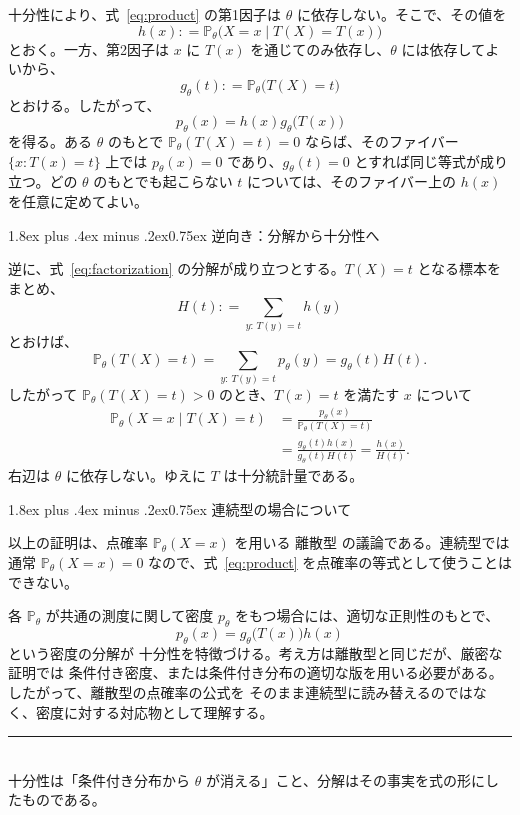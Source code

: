 \documentclass[11pt,a4paper]{article}
\makeatletter
\renewcommand\section{\@startsection{section}{1}{0pt}%
  {1.8ex plus .4ex minus .2ex}{0.75ex}%
  {\headingfont\large\color{accent}}}
\theoremstyle{factorization}
\newcommand{\given}{\mathrel{|}}
\newcommand{\Prob}{\mathbb{P}}
\newcommand{\coloneqq}{\mathrel{\mathop{:}}=}
\newcommand{\keyterm}[1]{{\headingfont\color{highlight}#1}}
\makeatother
\begin{document}
十分性により、式~\eqref{eq:product} の第1因子は $\theta$ に依存しない。そこで、その値を
\[
  h(x)
  \coloneqq
  \Prob_\theta\!\bigl(X=x\given T(X)=T(x)\bigr)
\]
とおく。一方、第2因子は $x$ に $T(x)$ を通じてのみ依存し、$\theta$ には依存してよいから、
\[
  g_\theta(t)
  \coloneqq
  \Prob_\theta\!\bigl(T(X)=t\bigr)
\]
とおける。したがって、
\[
  \boxed{\;p_\theta(x)=h(x)g_\theta\!\bigl(T(x)\bigr)\;}
\]
を得る。ある $\theta$ のもとで $\Prob_\theta(T(X)=t)=0$ ならば、そのファイバー $\{x:T(x)=t\}$ 上では $p_\theta(x)=0$ であり、$g_\theta(t)=0$ とすれば同じ等式が成り立つ。どの $\theta$ のもとでも起こらない $t$ については、そのファイバー上の $h(x)$ を任意に定めてよい。

\section{逆向き：分解から十分性へ}

逆に、式~\eqref{eq:factorization} の分解が成り立つとする。$T(X)=t$ となる標本をまとめ、
\[
  H(t)\coloneqq\sum_{y:\,T(y)=t}h(y)
\]
とおけば、
\[
  \Prob_\theta(T(X)=t)
  =\sum_{y:\,T(y)=t}p_\theta(y)
  =g_\theta(t)H(t).
\]
したがって $\Prob_\theta(T(X)=t)>0$ のとき、$T(x)=t$ を満たす $x$ について
\begin{align*}
  \Prob_\theta(X=x\given T(X)=t)
  &=\frac{p_\theta(x)}{\Prob_\theta(T(X)=t)}\\
  &=\frac{g_\theta(t)h(x)}{g_\theta(t)H(t)}
    =\frac{h(x)}{H(t)}.
\end{align*}
右辺は $\theta$ に依存しない。ゆえに $T$ は十分統計量である。

\section{連続型の場合について}

以上の証明は、点確率 $\Prob_\theta(X=x)$ を用いる \keyterm{離散型} の議論である。連続型では通常 $\Prob_\theta(X=x)=0$ なので、式~\eqref{eq:product} を点確率の等式として使うことはできない。

各 $\Prob_\theta$ が共通の測度に関して密度 $p_\theta$ をもつ場合には、適切な正則性のもとで、
\[
  p_\theta(x)=g_\theta\!\bigl(T(x)\bigr)h(x)
\]
という密度の分解が 十分性を特徴づける。考え方は離散型と同じだが、厳密な証明では 条件付き密度、または条件付き分布の適切な版を用いる必要がある。したがって、離散型の点確率の公式を そのまま連続型に読み替えるのではなく、密度に対する対応物として理解する。

\vfill
\begin{center}
  {\color{rulegray}\rule{0.58\textwidth}{0.6pt}}\\[-0.1em]
  {\small\headingfont\color{accent}
  十分性は「条件付き分布から $\theta$ が消える」こと、分解はその事実を式の形にしたものである。}
\end{center}
\end{document}
